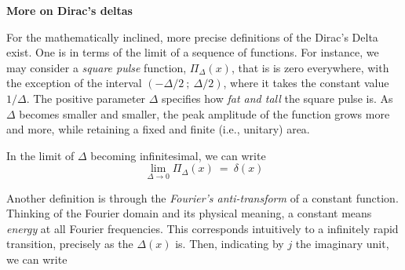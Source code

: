 \newpage
\begin{svgraybox}
	{\bf{More on Dirac's deltas}}

	For the mathematically inclined, more precise definitions of the Dirac's Delta exist. One is in terms of the limit of a sequence of functions. For instance, we may consider a \textit{square pulse} function, \(\Pi_\Delta(x)\), that is is zero everywhere, with the exception of the interval \((-\Delta/2\ ;\ \Delta/2)\), where it takes the constant value \( 1 / \Delta \). The positive parameter \(\Delta \) specifies how \textit{fat and tall} the square pulse is. As \(\Delta \) becomes smaller and smaller, the peak amplitude of the function grows more and more, while retaining a fixed and finite (i.e., unitary) area. 

 
  In the limit of \(\Delta\) becoming infinitesimal, we can write
    \begin{equation}
		\lim_{\Delta \rightarrow 0} \Pi_\Delta(x)\ =\ \delta(x)
	\end{equation}	
	
	Another definition is through the \textit{Fourier's anti-transform} of a constant function. Thinking of the Fourier domain and its physical meaning, a constant means \textit{energy} at all Fourier frequencies. This corresponds intuitively to a infinitely rapid transition, precisely as the \(\Delta(x)\) is. Then, indicating by \(j\) the imaginary unit, we can write


\end{svgraybox}
